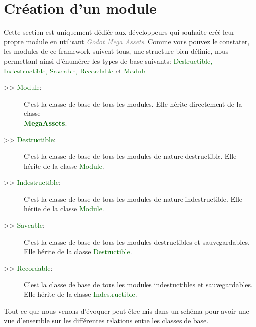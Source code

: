 \documentclass[a4paper, 11pt]{article}
\begin{document}
	\section{Création d'un module}
	Cette section est uniquement dédiée aux développeurs qui souhaite créé leur propre module en utilisant
	\textcolor{gray}{\textit{Godot Mega Assets}}. Comme vous pouvez le constater, les modules de ce 
	framework suivent tous, une structure bien définie, nous permettant ainsi d'énumérer les types de base
	suivants: \textcolor{darkgreen}{Destructible, Indestructible, Saveable, Recordable} et
	\textcolor{darkgreen}{Module}.
	\begin{description}
		\item[>> \textcolor{darkgreen}{Module}:] C'est la classe de base de tous les modules. Elle hérite
		directement de la classe \textbf{\textcolor{darkgreen}{\\MegaAssets}}.\\
		\item[>> \textcolor{darkgreen}{Destructible}:] C'est la classe de base de tous les modules de nature
		destructible. Elle hérite de la classe \textcolor{darkgreen}{Module}.\\
		\item[>> \textcolor{darkgreen}{Indestructible}:] C'est la classe de base de tous les modules de
		nature indestructible. Elle hérite de la classe \textcolor{darkgreen}{Module}.\\
		\item[>> \textcolor{darkgreen}{Saveable}:] C'est la classe de base de tous les modules destructibles
		et sauvegardables. Elle hérite de la classe \textcolor{darkgreen}{Destructible}.\\
		\item[>> \textcolor{darkgreen}{Recordable}:] C'est la classe de base de tous les modules
		indestuctibles et sauvegardables. Elle hérite de la classe \textcolor{darkgreen}{Indestructible}.
	\end{description}
	Tout ce que nous venons d'évoquer peut être mis dans un schéma pour avoir une vue d'ensemble
	sur les différentes relations entre les classes de base.
\end{document}
